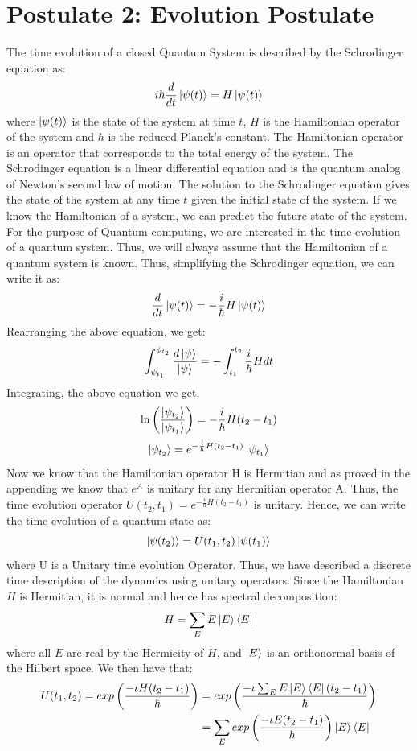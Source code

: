 \section{Postulate 2: Evolution Postulate}\label{subsection:Postulate 2}
The time evolution of a closed Quantum System is described by the Schrodinger equation as:
\[
    i\hbar\frac{d}{dt}\ket{\psi(t)}=H\ket{\psi(t)}
\]
where $\ket{\psi(t)}$ is the state of the system at time $t$, $H$ is the Hamiltonian operator of the system and $\hbar$ is the reduced Planck's constant.
The Hamiltonian operator is an operator that corresponds to the total energy of the system. The Schrodinger equation is a linear differential equation and is the quantum analog of Newton's second law of motion.
The solution to the Schrodinger equation gives the state of the system at any time $t$ given the initial state of the system.
If we know the Hamiltonian of a system, we can predict the future state of the system. For the purpose of Quantum computing, we are interested in the time evolution of a quantum system. Thus, we will
always assume that the Hamiltonian of a quantum system is known. Thus, simplifying the Schrodinger equation, we can write it as:
\[
    \frac{d}{dt}\ket{\psi(t)}=-\frac{i}{\hbar}H\ket{\psi(t)}
\]
Rearranging the above equation, we get:
\[
    \int_{\psi_{t_1}}^{\psi_{t_2}} \frac{d\ket{\psi}}{\ket{\psi}}=-\int_{t_1}^{t_2}\frac{i}{\hbar}Hdt
\]
Integrating, the above equation we get,
\[
    \ln\left(\frac{\ket{\psi_{t_2}}}{\ket{\psi_{t_1}}}\right)=-\frac{i}{\hbar}H(t_2-t_1)
\]
\[\ket{\psi_{t_2}}=e^{-\frac{i}{\hbar}H(t_2-t_1)}\ket{\psi_{t_1}}\]
Now we know that the Hamiltonian operator H is Hermitian and as proved in the appending we know that $e^{A}$ is unitary for any Hermitian operator A.
Thus, the time evolution operator $U(t_2,t_1)=e^{-\frac{i}{\hbar}H(t_2-t_1)}$ is unitary.
Hence, we can write the time evolution of a quantum state as:
\[
    \ket{\psi(t_2)}=U(t_1,t_2)\ket{\psi(t_1)}
\]
where U is a Unitary time evolution Operator. Thus, we have described a discrete time description of the dynamics using unitary operators.
Since the Hamiltonian $H$ is Hermitian, it is normal and hence has spectral decomposition:
\[
H=\sum_E E\ket{E}\bra{E}
\]
where all $E$ are real by the Hermicity of $H$, and $\ket{E}$ is an orthonormal basis of the Hilbert space. We then have that:
\begin{align*}
    U(t_1,t_2)=exp\left(\frac{-\iota H(t_2-t_1)}{\hbar}\right) &=exp\left(\frac{-\iota \sum_E E\ket{E}\bra{E}(t_2-t_1)}{\hbar}\right)\\
    &=\sum_E exp\left(\frac{-\iota E(t_2-t_1)}{\hbar}\right)\ket{E}\bra{E}
\end{align*}
